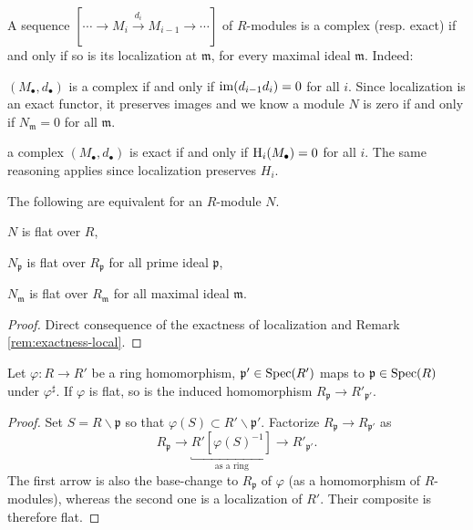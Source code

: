 \begin{remark}\label{rem:exactness-local}
	A sequence $[ \cdots \to M_i \xrightarrow{d_i} M_{i-1} \to \cdots]$ of $R$-modules is a complex (resp. exact) if and only if so is its localization at $\mathfrak{m}$, for every maximal ideal $\mathfrak{m}$. Indeed:
	\begin{compactitem}
		\item $(M_\bullet, d_\bullet)$ is a complex if and only if $\operatorname{im}(d_{i-1}d_i)=0$ for all $i$. Since localization is an exact functor, it preserves images and we know a module $N$ is zero if and only if $N_{\mathfrak{m}}=0$ for all $\mathfrak{m}$.
		\item a complex $(M_\bullet, d_\bullet)$ is exact if and only if $\operatorname{H}_i(M_\bullet)=0$ for all $i$. The same reasoning applies since localization preserves $H_i$.
	\end{compactitem}
\end{remark}

\begin{proposition}
	The following are equivalent for an $R$-module $N$.
	\begin{inparaenum}[(i)]
		\item $N$ is flat over $R$,
		\item $N_{\mathfrak{p}}$ is flat over $R_{\mathfrak{p}}$ for all prime ideal $\mathfrak{p}$,
		\item $N_{\mathfrak{m}}$ is flat over $R_{\mathfrak{m}}$ for all maximal ideal $\mathfrak{m}$.
	\end{inparaenum}
\end{proposition}
\begin{proof}
	Direct consequence of the exactness of localization and Remark \ref{rem:exactness-local}.
\end{proof}

\begin{lemma}\label{prop:flat-ring-localizations}
	Let $\varphi: R \to R'$ be a ring homomorphism, $\mathfrak{p}' \in \operatorname{Spec}(R')$ maps to $\mathfrak{p} \in \operatorname{Spec}(R)$ under $\varphi^\sharp$. If $\varphi$ is flat, so is the induced homomorphism $R_{\mathfrak{p}} \to R'_{\mathfrak{p}'}$.
\end{lemma}
\begin{proof}
	Set $S = R \smallsetminus \mathfrak{p}$ so that $\varphi(S) \subset R' \smallsetminus \mathfrak{p}'$. Factorize $R_{\mathfrak{p}} \to R_{\mathfrak{p}'}$ as
	\[ R_{\mathfrak{p}} \to \underbracket{R'[\varphi(S)^{-1}]}_{\text{as a ring}} \to R'_{\mathfrak{p}'}. \]
	The first arrow is also the base-change to $R_{\mathfrak{p}}$ of $\varphi$ (as a homomorphism of $R$-modules), whereas the second one is a localization of $R'$. Their composite is therefore flat.
\end{proof}

